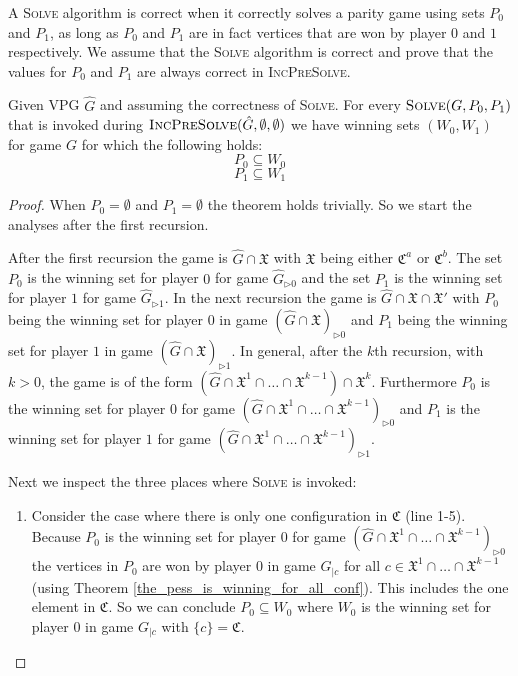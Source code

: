 A \textsc{Solve} algorithm is correct when it correctly solves a parity game using sets $P_0$ and $P_1$, as long as $P_0$ and $P_1$ are in fact vertices that are won by player $0$ and $1$ respectively. We assume that the \textsc{Solve} algorithm is correct and prove that the values for $P_0$ and $P_1$ are always correct in \textsc{IncPreSolve}.
\begin{lemma}
	Given VPG $\hat{G}$ and assuming the correctness of \textsc{Solve}. For every $\textsc{Solve}(G,P_0,P_1)$ that is invoked during $\textsc{IncPreSolve}(\hat{G},\emptyset,\emptyset)$ we have winning sets $(W_0,W_1)$ for game $G$ for which the following holds:
	\[ P_0 \subseteq  W_0 \]
	\[ P_1 \subseteq  W_1 \]
	\begin{proof}
		\label{lem_P0_and_P1_are_always_correct}
		When $P_0 = \emptyset$ and $P_1 = \emptyset$ the theorem holds trivially. So we start the analyses after the first recursion. 
		
		After the first recursion the game is $\hat{G} \cap \mathfrak{X}$ with $\mathfrak{X}$ being either $\mathfrak{C}^a$ or $\mathfrak{C}^b$. The set $P_0$ is the winning set for player $0$ for game $\hat{G}_{\triangleright0}$ and the set $P_1$ is the winning set for player $1$ for game $\hat{G}_{\triangleright1}$. In the next recursion the game is $\hat{G} \cap \mathfrak{X} \cap \mathfrak{X}'$ with $P_0$ being the winning set for player $0$ in game $(\hat{G} \cap \mathfrak{X})_{\triangleright0}$ and $P_1$ being the winning set for player $1$ in game $(\hat{G} \cap \mathfrak{X})_{\triangleright1}$. In general, after the $k$th recursion, with $k > 0$, the game is of the form  $(\hat{G} \cap \mathfrak{X}^1 \cap \dots \cap \mathfrak{X}^{k-1}) \cap \mathfrak{X}^k$. Furthermore $P_0$ is the winning set for player $0$ for game $(\hat{G} \cap \mathfrak{X}^1 \cap \dots \cap \mathfrak{X}^{k-1})_{\triangleright0}$ and $P_1$ is the winning set for player $1$ for game $(\hat{G} \cap \mathfrak{X}^1 \cap \dots \cap \mathfrak{X}^{k-1})_{\triangleright1}$.
		
		Next we inspect the three places where \textsc{Solve} is invoked:
		\begin{enumerate}
			\item Consider the case where there is only one configuration in $\mathfrak{C}$ (line 1-5). Because $P_0$ is the winning set for player $0$ for game $(\hat{G} \cap \mathfrak{X}^1 \cap \dots \cap \mathfrak{X}^{k-1})_{\triangleright0}$ the vertices in $P_0$ are won by player $0$ in game $G_{|c}$ for all $c \in \mathfrak{X}^1 \cap \dots \cap \mathfrak{X}^{k-1}$ (using Theorem \ref{the_pess_is_winning_for_all_conf}). This includes the one element in $\mathfrak{C}$. So we can conclude $P_0 \subseteq W_0$ where $W_0$ is the winning set for player $0$ in game $G_{|c}$ with $\{c\} = \mathfrak{C}$.
			

\end{enumerate}
\end{proof}
\end{lemma}

